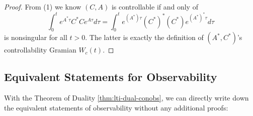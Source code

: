 \documentclass[
]{book}
\theoremstyle{definition}
\theoremstyle{definition}
\theoremstyle{definition}
\theoremstyle{definition}
\theoremstyle{remark}
\begin{document}
\begin{proof}
From (1) we know \((C,A)\) is controllable if and only of
\begin{equation*}
   \int_{0}^{t} e^{A^*\tau} C^*C e^{A\tau} d\tau = \int_{0}^{t} e^{(A^*)\tau} (C^*)^* (C^*) e^{(A^*)^*\tau} d\tau
\end{equation*}
is nonsingular for all \(t >0\). The latter is exactly the definition of \((A^*, C^*)\)'s controllability Gramian \(W_c(t)\).

\end{proof}

\hypertarget{equivalent-statements-for-observability}{%
\subsection{Equivalent Statements for Observability}\label{equivalent-statements-for-observability}}

With the Theorem of Duality \ref{thm:lti-dual-conobs}, we can directly write down the equivalent statements of observability without any additional proofs:
\end{document}
